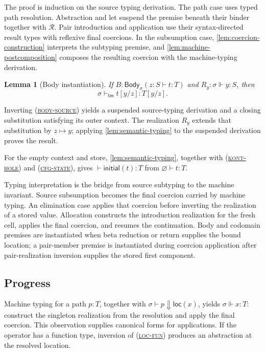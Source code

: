 \documentclass[acmsmall,screen,nonacm]{acmart}
\newtheorem{lemma}[theorem]{Lemma}
\newcommand{\ruleref}[1]{%
  \textsc{(\hyperref[rule:#1]{#1})}}
\newcommand{\ctxempty}{\varnothing}
\newcommand{\subst}[3]{#1[#2/#3]}
\newcommand{\resolve}{\Downarrow}
\newcommand{\loc}[1]{\mathsf{loc}(#1)}
\newcommand{\realizes}{\Vdash}
\newcommand{\bodycl}[5]{%
  \mathsf{Body}_{#1}(#2\!:\!#3\vdash #4:#5)}
\begin{document}
The proof is induction on the source typing derivation. The path case uses
typed path resolution. Abstraction and let suspend the premise beneath their binder
together with \(\mathcal R\). Pair introduction and application use their
syntax-directed result types with reflexive final coercions. In the subsumption case,
\cref{lem:coercion-construction} interprets the subtyping premise, and
\cref{lem:machine-postcomposition} composes the resulting coercion with the
machine-typing derivation.

\begin{lemma}[Body instantiation]
\label{lem:body-instantiation}
If \(B:\bodycl{\sigma}{z}{S}{t}{T}\) and
\(R_y:\sigma\realizes y:S\), then
\[
  \sigma\vdash_{\mathsf{tm}}\subst{t}{y}{z}:\subst{T}{y}{z}.
\]
\end{lemma}

Inverting \ruleref{body-source} yields a suspended source-typing derivation and a
closing substitution satisfying its outer context. The realization \(R_y\)
extends that substitution by \(z\mapsto y\); applying
\cref{lem:semantic-typing} to the suspended derivation proves the result.

For the empty context and store, \cref{lem:semantic-typing}, together with
\ruleref{kont-hole} and \ruleref{cfg-state}, gives
\(\vdash\mathsf{initial}(t):T\) from \(\ctxempty\vdash t:T\).

Typing interpretation is the bridge from source subtyping to the machine
invariant. Source subsumption becomes the final coercion carried by machine
typing. An elimination case applies that coercion before inverting the
realization of a stored value. Allocation constructs the introduction
realization for the fresh cell, applies the final coercion, and resumes the
continuation. Body and codomain premises are instantiated when beta reduction
or return supplies the bound location; a pair-member premise is instantiated
during coercion application after pair-realization inversion supplies the
stored first component.

\subsection{Progress}

Machine typing for a path \(p:T\), together with
\(\sigma\vdash p\resolve\loc x\), yields \(\sigma\realizes x:T\): construct
the singleton realization from the resolution and apply the final coercion.
This observation supplies canonical forms for applications. If the operator
has a function type, inversion of \ruleref{loc-fun} produces an abstraction at
the resolved location.
\end{document}
